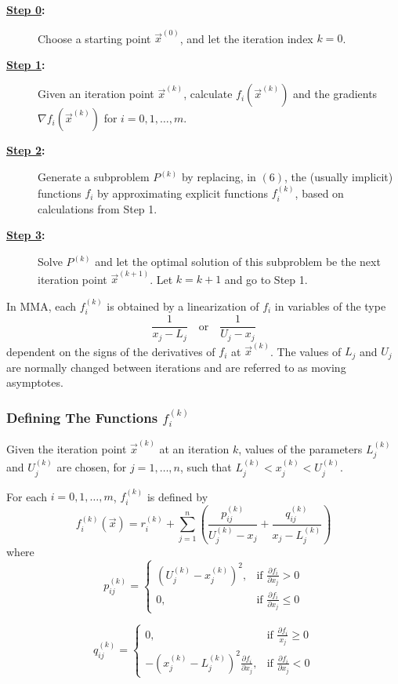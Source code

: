 \begin{description}
	\item[\textbf{\underline{Step 0}:}] Choose a starting point $\vec{x}^{(0)}$, and let the iteration index $k=0$.
	\item[\textbf{\underline{Step 1}:}] Given an iteration point $\vec{x}^{(k)}$, calculate $f_i(\vec{x}^{(k)})$ and the gradients $\nabla f_i(\vec{x}^{(k)})$ for $i=0,1,\ldots,m$.
	\item[\textbf{\underline{Step 2}:}] Generate a subproblem $P^{(k)}$ by replacing, in $(6)$, the (usually implicit) functions $f_i$ by approximating explicit functions $f_i^{(k)}$, based on calculations from Step 1.
	\item[\textbf{\underline{Step 3}:}] Solve $P^{(k)}$ and let the optimal solution of this subproblem be the next iteration point $\vec{x}^{(k+1)}$. Let $k=k+1$ and go to Step 1.
\end{description}

In MMA, each $f_i^{(k)}$ is obtained by a linearization of $f_i$ in variables of the type $$\frac{1}{x_j-L_j}\quad\text{or}\quad\frac{1}{U_j-x_j}$$ dependent on the signs of the derivatives of $f_i$ at $\vec{x}^{(k)}$. The values of $L_j$ and $U_j$ are normally changed between iterations and are referred to as moving asymptotes.

\subsubsection*{Defining The Functions $f_i^{(k)}$}

Given the iteration point $\vec{x}^{(k)}$ at an iteration $k$, values of the parameters $L_j^{(k)}$ and $U_j^{(k)}$ are chosen, for $j=1,\ldots,n$, such that $L_j^{(k)}<x_j^{(k)}<U_j^{(k)}$.


For each $i=0,1,\ldots,m$, $f_i^{(k)}$ is defined by $$f_i^{(k)}(\vec{x})=r_i^{(k)}+\sum\limits_{j=1}^{n}\left(\frac{p_{ij}^{(k)}}{U_j^{(k)}-x_j}+\frac{q_{ij}^{(k)}}{x_j-L_j^{(k)}}\right)$$
where
$$p_{ij}^{(k)}=\begin{cases}
\left(U_j^{(k)}-x_j^{(k)}\right)^2, & \text{if }\frac{\partial f_i}{\partial x_j}>0\\
0, & \text{if }\frac{\partial f_i}{\partial x_j}\leq 0
\end{cases}$$
	
$$q_{ij}^{(k)}=\begin{cases}
0, & \text{if }\frac{\partial f_i}{x_j}\geq 0\\
-\left(x_j^{(k)}-L_j^{(k)}\right)^2\frac{\partial f_i}{\partial x_j}, & \text{if }\frac{\partial f_i}{\partial x_j}<0
\end{cases}$$
	
